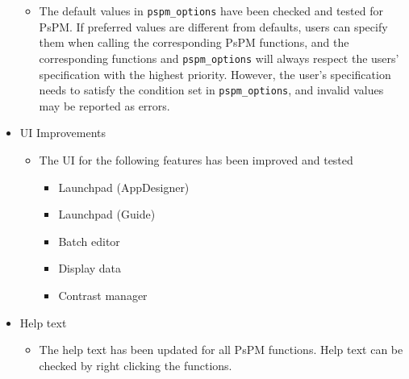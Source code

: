 \documentclass[english]{article}
\numberwithin{equation}{section}
\numberwithin{figure}{section}
\begin{document}
\begin{itemize}
\begin{itemize}
			\item The default values in \texttt{pspm\_options} have been checked and tested for PsPM. If preferred values are different from defaults, users can specify them when calling the corresponding PsPM functions, and the corresponding functions and \texttt{pspm\_options} will always respect the users' specification with the highest priority. However, the user's specification needs to satisfy the condition set in \texttt{pspm\_options}, and invalid values may be reported as errors.
		\end{itemize}
		\item UI Improvements
		\begin{itemize}
			\item The UI for the following features has been improved and tested
			\begin{itemize}
				\item Launchpad (AppDesigner)
				\item Launchpad (Guide)
				\item Batch editor
				\item Display data
				\item Contrast manager
			\end{itemize}
		\end{itemize}
		\item Help text
		\begin{itemize}
			\item The help text has been updated for all PsPM functions. Help text can be checked by right clicking the functions.
		\end{itemize}
	\end{itemize}
\end{document}
